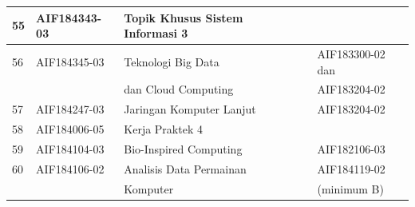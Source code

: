 \begin{table}[H]
\begin{tabular}{|p{0.5cm}|p{2.85cm}|p{4.95cm}|p{2.7cm}|p{2.7cm}|}
55 & AIF184343-03 & Topik Khusus Sistem Informasi 3                                  &              &                    \\ \hline
56 & AIF184345-03 & Teknologi Big Data                                               &              & AIF183300-02 dan   \\
   &              &  dan Cloud Computing                                             &              & AIF183204-02       \\ \hline
57 & AIF184247-03 & Jaringan Komputer Lanjut                                         &              & AIF183204-02       \\ \hline
58 & AIF184006-05 & Kerja Praktek 4                                                  &              &                    \\ \hline
59 & AIF184104-03 & Bio-Inspired Computing                                           &              & AIF182106-03       \\ \hline
60 & AIF184106-02 & Analisis Data Permainan                                          &              & AIF184119-02       \\
   &              & Komputer                                                         &              & (minimum B)        \\ \hline
		\end{tabular}
	\label{tab:DaftarMataKuliahWajibDanPrasyaratnya2}
\end{table}

